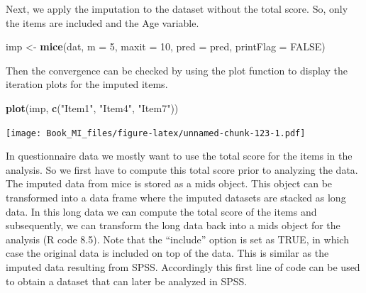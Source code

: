 \documentclass[]{book}
\newenvironment{Shaded}{\begin{snugshade}}{\end{snugshade}}
\newcommand{\KeywordTok}[1]{\textcolor[rgb]{0.13,0.29,0.53}{\textbf{#1}}}
\newcommand{\DataTypeTok}[1]{\textcolor[rgb]{0.13,0.29,0.53}{#1}}
\newcommand{\DecValTok}[1]{\textcolor[rgb]{0.00,0.00,0.81}{#1}}
\newcommand{\StringTok}[1]{\textcolor[rgb]{0.31,0.60,0.02}{#1}}
\newcommand{\OtherTok}[1]{\textcolor[rgb]{0.56,0.35,0.01}{#1}}
\newcommand{\OperatorTok}[1]{\textcolor[rgb]{0.81,0.36,0.00}{\textbf{#1}}}
\newcommand{\NormalTok}[1]{#1}
\begin{document}
Next, we apply the imputation to the dataset without the total score.
So, only the items are included and the Age variable.

\begin{Shaded}
\begin{Highlighting}[]
\NormalTok{imp <-}\StringTok{ }\KeywordTok{mice}\NormalTok{(dat, }\DataTypeTok{m =} \DecValTok{5}\NormalTok{, }\DataTypeTok{maxit =} \DecValTok{10}\NormalTok{, }\DataTypeTok{pred =}\NormalTok{ pred, }\DataTypeTok{printFlag =} \OtherTok{FALSE}\NormalTok{)}
\end{Highlighting}
\end{Shaded}

Then the convergence can be checked by using the plot function to
display the iteration plots for the imputed items.

\begin{Shaded}
\begin{Highlighting}[]
\KeywordTok{plot}\NormalTok{(imp, }\KeywordTok{c}\NormalTok{(}\StringTok{"Item1"}\NormalTok{, }\StringTok{"Item4"}\NormalTok{, }\StringTok{"Item7"}\NormalTok{))}
\end{Highlighting}
\end{Shaded}

\texttt{[image: Book\_MI\_files/figure-latex/unnamed-chunk-123-1.pdf]}

In questionnaire data we mostly want to use the total score for the
items in the analysis. So we first have to compute this total score
prior to analyzing the data. The imputed data from mice is stored as a
mids object. This object can be transformed into a data frame where the
imputed datasets are stacked as long data. In this long data we can
compute the total score of the items and subsequently, we can transform
the long data back into a mids object for the analysis (R code 8.5).
Note that the ``include'' option is set as TRUE, in which case the
original data is included on top of the data. This is similar as the
imputed data resulting from SPSS. Accordingly this first line of code
can be used to obtain a dataset that can later be analyzed in SPSS.

\begin{Shaded}
\end{Shaded}
\end{document}
